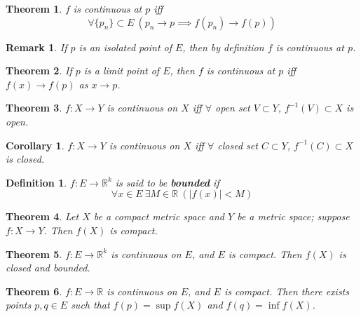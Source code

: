 \documentclass[aps,pra,onecolumn,notitlepage,superscriptaddress]{revtex4-1}
\newcommand{\R}{\mathbb{R}}
\newtheorem{theo}{Theorem}
\newtheorem{cor}{Corollary}
\newtheorem{defi}{Definition}
\newtheorem{rem}{Remark}
\begin{document}
    \begin{theo}
        $f$ is continuous at $p$ iff
        \begin{equation}
            \forall \{p_n\} \subset E \ (p_n \to p \implies f(p_n) \to f(p))
        \end{equation}
    \end{theo}

    \begin{rem}
        If $p$ is an isolated point of $E$, then by definition $f$ is continuous at $p$.
    \end{rem}

    \begin{theo}
        If $p$ is a limit point of $E$, then $f$ is continuous at $p$ iff $f(x) \to f(p)$ as $x \to p$.
    \end{theo}

    \begin{theo}
        $f: X \to Y$ is continuous on $X$ iff $\forall$ open set $V \subset Y$, $f^{-1}(V) \subset X$ is open.
    \end{theo}
    \begin{cor}
        $f: X \to Y$ is continuous on $X$ iff $\forall$ closed set $C \subset Y$, $f^{-1}(C) \subset X$ is closed.
    \end{cor}

    \begin{defi}
        $f: E \to \R^k$ is said to be \textbf{bounded} if
        \begin{equation}
            \forall x \in E \ \exists M \in \R \ ( | f(x) | < M )
        \end{equation}
    \end{defi}

    \begin{theo}
        Let $X$ be a compact metric space and $Y$ be a metric space; suppose $f: X \to Y$. Then $f(X)$ is compact.
    \end{theo}

    \begin{theo}
        $f: E \to \R^k$ is continuous on $E$, and $E$ is compact. Then $f(X)$ is closed and bounded.
    \end{theo}

    \begin{theo}
        $f: E \to \R$ is continuous on $E$, and $E$ is compact. Then there exists points $p, q \in E$ such that $f(p) = \sup f(X)$ and $f(q) = \inf f(X)$.
    \end{theo}
\end{document}
